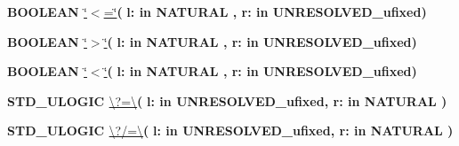 \begin{DoxyCompactItemize}
\item 
{\bfseries {\bfseries \textcolor{comment}{B\+O\+O\+L\+E\+A\+N}\textcolor{vhdlchar}{ }}} \hyperlink{classfixed__pkg_a65b73a94d4fe541a941f431175b342b7}{\char`\"{}$<$=\char`\"{}}{\bfseries  ( }{\bfseries \textcolor{vhdlchar}{l\+: }\textcolor{stringliteral}{in }{\bfseries \textcolor{comment}{N\+A\+T\+U\+R\+A\+L}\textcolor{vhdlchar}{ }}}{\bfseries  , \textcolor{vhdlchar}{r\+: }\textcolor{stringliteral}{in }\textcolor{vhdlchar}{U\+N\+R\+E\+S\+O\+L\+V\+E\+D\+\_\+ufixed}}{\bfseries  )} 
\item 
{\bfseries {\bfseries \textcolor{comment}{B\+O\+O\+L\+E\+A\+N}\textcolor{vhdlchar}{ }}} \hyperlink{classfixed__pkg_ac6c82329bf849852be997a3d0a737cf9}{\char`\"{}$>$\char`\"{}}{\bfseries  ( }{\bfseries \textcolor{vhdlchar}{l\+: }\textcolor{stringliteral}{in }{\bfseries \textcolor{comment}{N\+A\+T\+U\+R\+A\+L}\textcolor{vhdlchar}{ }}}{\bfseries  , \textcolor{vhdlchar}{r\+: }\textcolor{stringliteral}{in }\textcolor{vhdlchar}{U\+N\+R\+E\+S\+O\+L\+V\+E\+D\+\_\+ufixed}}{\bfseries  )} 
\item 
{\bfseries {\bfseries \textcolor{comment}{B\+O\+O\+L\+E\+A\+N}\textcolor{vhdlchar}{ }}} \hyperlink{classfixed__pkg_a5d059cf3277e3585e4f3f076db10b273}{\char`\"{}$<$\char`\"{}}{\bfseries  ( }{\bfseries \textcolor{vhdlchar}{l\+: }\textcolor{stringliteral}{in }{\bfseries \textcolor{comment}{N\+A\+T\+U\+R\+A\+L}\textcolor{vhdlchar}{ }}}{\bfseries  , \textcolor{vhdlchar}{r\+: }\textcolor{stringliteral}{in }\textcolor{vhdlchar}{U\+N\+R\+E\+S\+O\+L\+V\+E\+D\+\_\+ufixed}}{\bfseries  )} 
\item 
{\bfseries {\bfseries \textcolor{comment}{S\+T\+D\+\_\+\+U\+L\+O\+G\+I\+C}\textcolor{vhdlchar}{ }}} \hyperlink{classfixed__pkg_a69151531d87456d952c2073704fa1779}{\textbackslash{}?=\textbackslash{}}{\bfseries  ( }{\bfseries \textcolor{vhdlchar}{l\+: }\textcolor{stringliteral}{in }\textcolor{vhdlchar}{U\+N\+R\+E\+S\+O\+L\+V\+E\+D\+\_\+ufixed}}{\bfseries  , \textcolor{vhdlchar}{r\+: }\textcolor{stringliteral}{in }{\bfseries \textcolor{comment}{N\+A\+T\+U\+R\+A\+L}\textcolor{vhdlchar}{ }}}{\bfseries  )} 
\item 
{\bfseries {\bfseries \textcolor{comment}{S\+T\+D\+\_\+\+U\+L\+O\+G\+I\+C}\textcolor{vhdlchar}{ }}} \hyperlink{classfixed__pkg_a172a73302b09f0d298b93ecda8c5e976}{\textbackslash{}?/=\textbackslash{}}{\bfseries  ( }{\bfseries \textcolor{vhdlchar}{l\+: }\textcolor{stringliteral}{in }\textcolor{vhdlchar}{U\+N\+R\+E\+S\+O\+L\+V\+E\+D\+\_\+ufixed}}{\bfseries  , \textcolor{vhdlchar}{r\+: }\textcolor{stringliteral}{in }{\bfseries \textcolor{comment}{N\+A\+T\+U\+R\+A\+L}\textcolor{vhdlchar}{ }}}{\bfseries  )} 

\end{DoxyCompactItemize}
